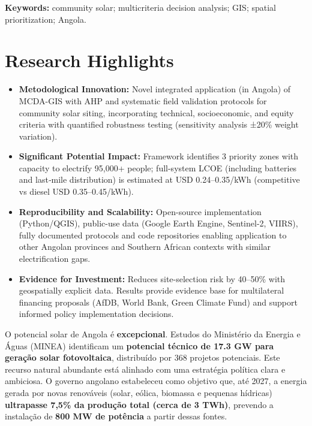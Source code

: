 \documentclass[12pt, a4paper]{article}
\begin{document}
{{{{{{{{{{{{\begin{abstract}
\textbf{Conclusion:} The framework is reproducible for other Angolan provinces and Southern African contexts with similar data gaps. It provides geospatially explicit evidence to support multilateral financing proposals and reduce site-selection risk by 40–50\%.
\end{abstract}
\vspace{6pt}
\noindent\textbf{Keywords:} community solar; multicriteria decision analysis; GIS; spatial prioritization; Angola.

\section*{Research Highlights}
\begin{itemize}
    \item \textbf{Metodological Innovation:} Novel integrated application (in Angola) of MCDA-GIS with AHP and systematic field validation protocols for community solar siting, incorporating technical, socioeconomic, and equity criteria with quantified robustness testing (sensitivity analysis ±20\% weight variation).
    \item \textbf{Significant Potential Impact:} Framework identifies 3 priority zones with capacity to electrify 95,000+ people; full-system LCOE (including batteries and last‑mile distribution) is estimated at USD 0.24–0.35/kWh (competitive vs diesel USD 0.35–0.45/kWh).
    \item \textbf{Reproducibility and Scalability:} Open-source implementation (Python/QGIS), public-use data (Google Earth Engine, Sentinel-2, VIIRS), fully documented protocols and code repositories enabling application to other Angolan provinces and Southern African contexts with similar electrification gaps.
    \item \textbf{Evidence for Investment:} Reduces site-selection risk by 40–50\% with geospatially explicit data. Results provide evidence base for multilateral financing proposals (AfDB, World Bank, Green Climate Fund) and support informed policy implementation decisions.
\end{itemize}

\newpage

\tableofcontents
\newpage

O potencial solar de Angola é \textbf{excepcional}. Estudos do Ministério da Energia e Águas (MINEA) identificam um \textbf{potencial técnico de 17.3 GW para geração solar fotovoltaica}, distribuído por 368 projetos potenciais. Este recurso natural abundante está alinhado com uma estratégia política clara e ambiciosa. O governo angolano estabeleceu como objetivo que, até 2027, a energia gerada por novas renováveis (solar, eólica, biomassa e pequenas hídricas) \textbf{ultrapasse 7,5\% da produção total (cerca de 3 TWh)}, prevendo a instalação de \textbf{800 MW de potência} a partir dessas fontes.

}}}}}}}}}}}}
\end{document}
